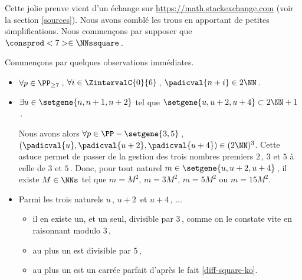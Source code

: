 Cette jolie preuve vient d'un échange sur \url{https://math.stackexchange.com} (voir la section \ref{sources}). Nous avons comblé les trous en apportant de petites simplifications.
Nous commençons par supposer que $\consprod<7> \in \NNssquare$\,.

\smallskip

Commençons par quelques observations immédiates.
%
\begin{itemize}
	\item  
	$\forall p \in \PP_{\geq 7}$\,, 
	$\forall i \in \ZintervalC{0}{6}$\,, 
	$\padicval{n + i} \in 2 \NN$\,.
	
	
	\item $\exists u \in \setgene{n, n+1, n+2}$ tel que $\setgene{u, u + 2, u + 4} \subset 2 \NN + 1$\,.
		
	\noindent
	Nous avons alors
	$\forall p \in \PP - \setgene{3, 5}$\,, 
	$(\padicval{u}, \padicval{u+2}, \padicval{u+4}) \in ( 2 \NN )^3$.
	Cette astuce permet de passer de la gestion des trois nombres premiers $2$\,, $3$ et $5$ à celle de $3$ et $5$\,.
	Donc, pour tout naturel $m \in \setgene{u, u + 2, u + 4}$\,, 
	il existe $M \in \NNs$ tel que 
	$m = M^2$, $m = 3 M^2$, $m = 5 M^2$ ou $m = 15 M^2$.
	
	
	\item Parmi les trois naturels $u$\,, $u + 2$\, et $u + 4$\,, ...
	\begin{itemize}
		\item il en existe un, et un seul, divisible par $3$\,, comme on le constate vite en raisonnant modulo $3$\,,

		\item au plus un est divisible par $5$\,,

		\item au plus un est un carrée parfait d'après le fait \ref{diff-square-ko}.
	\end{itemize}
\end{itemize}

\smallskip
	
